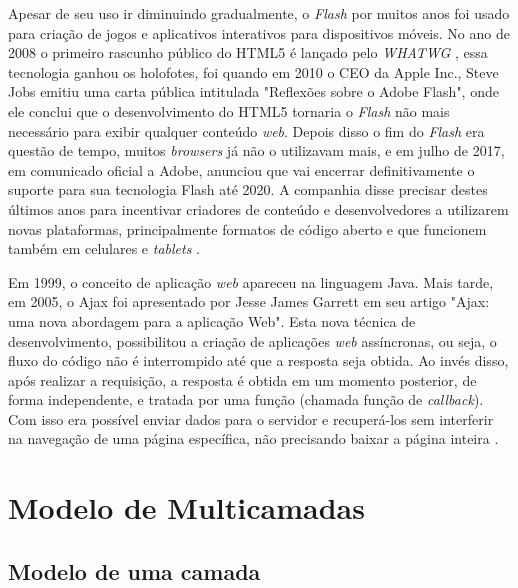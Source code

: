  Apesar de  seu uso ir diminuindo gradualmente, o \textit{Flash} por muitos anos foi usado para criação de jogos e aplicativos interativos para dispositivos móveis. No ano de 2008 o primeiro rascunho público do \ac{HTML}5 é lançado pelo \textit{WHATWG} \cite{fasthosts2018}, essa tecnologia ganhou os holofotes, foi quando em 2010 o CEO da Apple Inc., Steve Jobs emitiu uma carta pública intitulada "Reflexões sobre o Adobe Flash", onde ele conclui que o desenvolvimento do \ac{HTML}5 tornaria o \textit{Flash} não mais necessário para exibir qualquer conteúdo \textit{web}. Depois disso o fim do \textit{Flash} era questão de tempo, muitos \textit{browsers} já não o utilizavam mais, e em julho de 2017, em comunicado oficial a Adobe, anunciou que vai encerrar definitivamente o suporte para sua tecnologia Flash até 2020. A companhia disse precisar destes últimos anos para incentivar criadores de conteúdo e desenvolvedores a utilizarem novas plataformas, principalmente formatos de código aberto e que funcionem também em celulares e \textit{tablets}  \cite{canaltechFlashFim2018}.

Em 1999, o conceito de aplicação \textit{web} apareceu na linguagem Java. Mais tarde, em 2005, o Ajax foi apresentado por Jesse James Garrett em seu artigo "Ajax: uma nova abordagem para a aplicação Web". Esta nova técnica de desenvolvimento, possibilitou a criação de aplicações \textit{web} assíncronas, ou seja, o fluxo do código não é interrompido até que a resposta seja obtida. Ao invés disso, após realizar a requisição, a resposta é obtida em um momento posterior, de forma independente, e tratada por uma função (chamada função de \textit{callback}). Com isso era possível enviar dados para o servidor e recuperá-los sem interferir na navegação de uma página específica, não precisando baixar a página inteira \cite{devmediaAsync2018}.


\section{Modelo de Multicamadas}
\label{s_c2_figuras}


\subsection*{Modelo de uma camada}

